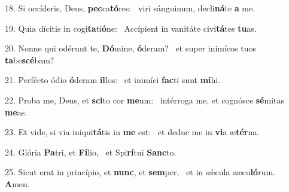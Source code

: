 18. Si occíderis, Deus, \textbf{pec}ca\textbf{tó}res: \ast\  viri sánguinum, decli\textbf{ná}te \textbf{a} me.\

19. Quia dícitis in cogi\textbf{ta}ti\textbf{ó}ne: \ast\  Accípient in vanitáte civi\textbf{tá}tes \textbf{tu}as.\

20. Nonne qui odérunt te, \textbf{Dó}mine, \textbf{ó}deram? \ast\  et super inimícos tuos \textbf{ta}be\textbf{scé}bam?\

21. Perfécto ódio \textbf{ó}deram \textbf{il}los: \ast\  et inimíci \textbf{fac}ti sunt \textbf{mi}hi.\

22. Proba me, Deus, et \textbf{sci}to cor \textbf{me}um: \ast\  intérroga me, et cognósce \textbf{sé}mitas \textbf{me}as.\

23. Et vide, si via iniqui\textbf{tá}tis in \textbf{me} est: \ast\  et deduc me in \textbf{vi}a æ\textbf{tér}na.\

24. Glória \textbf{Pa}tri, et \textbf{Fí}lio, \ast\  et Spi\textbf{rí}tui \textbf{Sanc}to.\

25. Sicut erat in princípio, et \textbf{nunc}, et \textbf{sem}per, \ast\  et in sǽcula sæcu\textbf{ló}rum. \textbf{A}men.\

